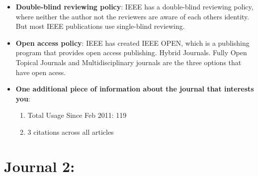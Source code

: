 \documentclass[11pt,twocolumn]{article}
\begin{document}
\begin{itemize}
	   \item {\bf{Double-blind reviewing policy}}: IEEE has a double-blind reviewing policy, where neither the author not the reviewers are aware of each others identity. But most IEEE publications use single-blind reviewing.

	    \item {\bf{Open access policy}}: IEEE has created IEEE OPEN, which is a publishing program that provides open access publishing. Hybrid Journals. Fully Open Topical Journals and Multidisciplinary journals are the three options that have open acess.

	\item {\bf{One additional piece of information about the journal that interests you}}: 
               \begin{enumerate}
                   \item Total Usage Since Feb 2011: 119
                    \item 3 citations across all articles \nocite{mobile}
               \end{enumerate}


\end{itemize}

\section{Journal 2:}
\end{document}
